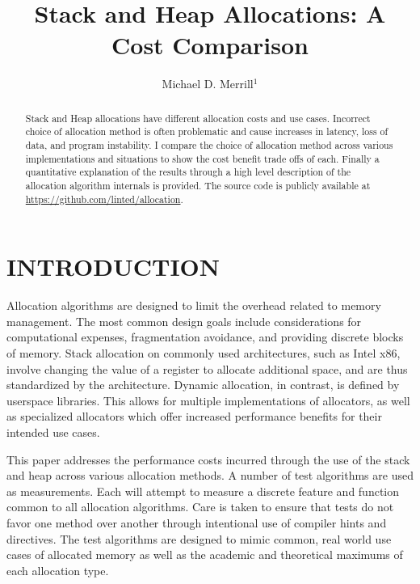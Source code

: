 \documentclass[letterpaper, 10 pt, conference]{ieeeconf}  %
\title{\LARGE \bf
Stack and Heap Allocations: A Cost Comparison
}
\author{Michael D. Merrill$^{1}$}
\newcommand*\GitHubLoc{https://github.com/linted/allocation}
\begin{document}
\maketitle
\thispagestyle{empty}
\pagestyle{empty}


\begin{abstract}
Stack and Heap allocations have different allocation costs and use cases.
Incorrect choice of allocation method is often problematic and cause increases in latency,
loss of data, and program instability. I compare the choice of allocation method across various 
implementations and situations to show the cost benefit trade offs of each. 
Finally a quantitative explanation of the results through a high level description of the allocation algorithm internals is provided.
The source code is publicly available at \url{\GitHubLoc}.

\end{abstract}

\section{INTRODUCTION}

Allocation algorithms are designed to limit the overhead related to memory management.
The most common design goals include considerations for computational expenses, fragmentation avoidance, and providing discrete blocks of memory. 
Stack allocation on commonly used architectures, such as Intel x86, involve changing the value of a register to allocate additional space, and are thus standardized by the architecture.
Dynamic allocation, in contrast, is defined by userspace libraries.
This allows for multiple implementations of allocators, as well as specialized allocators which offer increased performance benefits for their intended use cases. 

This paper addresses the performance costs incurred through the use of the stack and heap across various allocation methods. 
A number of test algorithms are used as measurements. 
Each will attempt to measure a discrete feature and function common to all allocation algorithms. 
Care is taken to ensure that tests do not favor one method over another through intentional use of compiler hints and directives. 
The test algorithms are designed to mimic common, real world use cases of allocated memory as well as the academic and theoretical maximums of each allocation type. 
\end{document}
